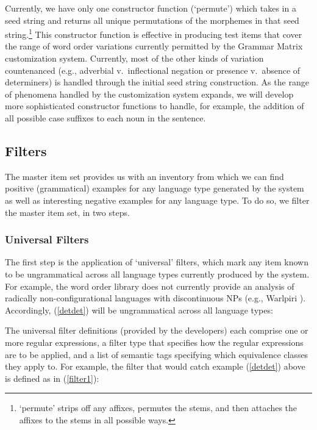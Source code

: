 \documentclass[11pt]{article}
\begin{document}
Currently, we have only one constructor function (`permute') which
takes in a seed string and returns all unique permutations of the
morphemes in that seed string.\footnote{`permute' strips off any
affixes, permutes the stems, and then attaches the affixes to the
stems in all possible ways.}  This constructor function is effective
in producing test items that cover the range of word order variations
currently permitted by the Grammar Matrix customization system.  
Currently, most of the other kinds of variation countenanced (e.g.,
adverbial v.\ inflectional negation or presence v.\ absence of determiners) 
is handled through the initial seed string construction.  As the range of
phenomena handled by the customization system expands, we will develop
more sophisticated constructor functions to handle, for
example, the addition of all possible case suffixes to each noun
in the sentence.

\subsection{Filters}

The master item set provides us with an inventory from which we
can find positive (grammatical) examples for any language type
generated by the system as well as interesting negative examples for
any language type.  To do so, we filter the master item set, in two
steps.  


\subsubsection{Universal Filters}

The first step is the application of `universal' filters, which mark any
item known to be ungrammatical across all language types currently
produced by the system.  For example, the word order library does
not currently provide an analysis of radically non-configurational
languages with discontinuous NPs (e.g., Warlpiri \cite{Hale81}).
Accordingly, (\ref{detdet}) will be ungrammatical
across all language types:


The universal filter definitions (provided by the developers)
each comprise one or more regular expressions, a filter type that
specifies how the regular expressions are to be applied, and a list of
semantic tags specifying which equivalence classes they apply to.  For
example, the filter that would catch example (\ref{detdet}) above
is defined as in (\ref{filter1}):
\end{document}
